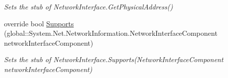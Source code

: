 \begin{DoxyCompactItemize}
\begin{DoxyCompactList}\small\item\em Sets the stub of Network\-Interface.\-Get\-Physical\-Address()\end{DoxyCompactList}\item 
override bool \hyperlink{class_system_1_1_net_1_1_network_information_1_1_fakes_1_1_stub_network_interface_aad39f02d821c48a465c48d56fbefdcec}{Supports} (global\-::\-System.\-Net.\-Network\-Information.\-Network\-Interface\-Component network\-Interface\-Component)
\begin{DoxyCompactList}\small\item\em Sets the stub of Network\-Interface.\-Supports(\-Network\-Interface\-Component network\-Interface\-Component)\end{DoxyCompactList}\end{DoxyCompactItemize}
